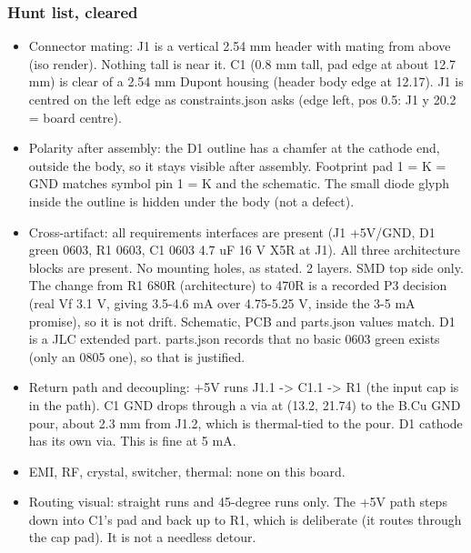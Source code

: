 \documentclass[11pt]{article}
\begin{document}
\subsubsection*{Hunt list, cleared}
\begin{itemize}
\item Connector mating: J1 is a vertical 2.54 mm header with mating from above (iso render). Nothing tall
is near it. C1 (0.8 mm tall, pad edge at about 12.7 mm) is clear of a 2.54 mm Dupont housing
(header body edge at 12.17). J1 is centred on the left edge as constraints.json asks
(edge left, pos 0.5: J1 y 20.2 = board centre).
\item Polarity after assembly: the D1 outline has a chamfer at the cathode end, outside the body, so it
stays visible after assembly. Footprint pad 1 = K = GND matches symbol pin 1 = K and
the schematic. The small diode glyph inside the outline is hidden under the body (not a defect).
\item Cross-artifact: all requirements interfaces are present (J1 +5V/GND, D1 green 0603, R1 0603,
C1 0603 4.7 uF 16 V X5R at J1). All three architecture blocks are present. No mounting holes, as
stated. 2 layers. SMD top side only. The change from R1 680R (architecture) to 470R is a recorded P3
decision (real Vf 3.1 V, giving 3.5-4.6 mA over 4.75-5.25 V, inside the 3-5 mA promise), so it is not drift.
Schematic, PCB and parts.json values match. D1 is a JLC extended part. parts.json records that no
basic 0603 green exists (only an 0805 one), so that is justified.
\item Return path and decoupling: +5V runs J1.1 -\textgreater{} C1.1 -\textgreater{} R1 (the input cap is in the path). C1 GND drops
through a via at (13.2, 21.74) to the B.Cu GND pour, about 2.3 mm from J1.2, which is thermal-tied
to the pour. D1 cathode has its own via. This is fine at 5 mA.
\item EMI, RF, crystal, switcher, thermal: none on this board.
\item Routing visual: straight runs and 45-degree runs only. The +5V path steps down into C1's pad and back
up to R1, which is deliberate (it routes through the cap pad). It is not a needless detour.
\end{itemize}
\end{document}

